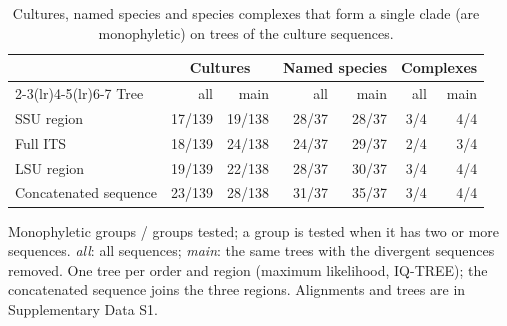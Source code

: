 \begin{table}[htbp]\centering
\begin{threeparttable}
\caption{Cultures, named species and species complexes that form a single clade (are monophyletic) on trees of
the culture sequences.}
\label{tab:monophyly}
\footnotesize\setlength{\tabcolsep}{4pt}
\begin{tabular}{lrrrrrr}
\toprule
 & \multicolumn{2}{c}{Cultures} & \multicolumn{2}{c}{Named species} & \multicolumn{2}{c}{Complexes}\\
\cmidrule(lr){2-3}\cmidrule(lr){4-5}\cmidrule(lr){6-7}
Tree & all & main & all & main & all & main\\
\midrule
SSU region & 17/139 & 19/138 & 28/37 & 28/37 & 3/4 & 4/4\\
Full ITS & 18/139 & 24/138 & 24/37 & 29/37 & 2/4 & 3/4\\
LSU region & 19/139 & 22/138 & 28/37 & 30/37 & 3/4 & 4/4\\
Concatenated sequence & 23/139 & 28/138 & 31/37 & 35/37 & 3/4 & 4/4\\
\bottomrule
\end{tabular}
\begin{tablenotes}\footnotesize
\item Monophyletic groups / groups tested; a group is tested when it has two or more sequences. \emph{all}: all sequences;
\emph{main}: the same trees with the divergent sequences removed. One tree per order and region (maximum likelihood,
IQ-TREE); the concatenated sequence joins the three regions. Alignments and trees are in Supplementary Data S1.
\end{tablenotes}
\end{threeparttable}
\end{table}
